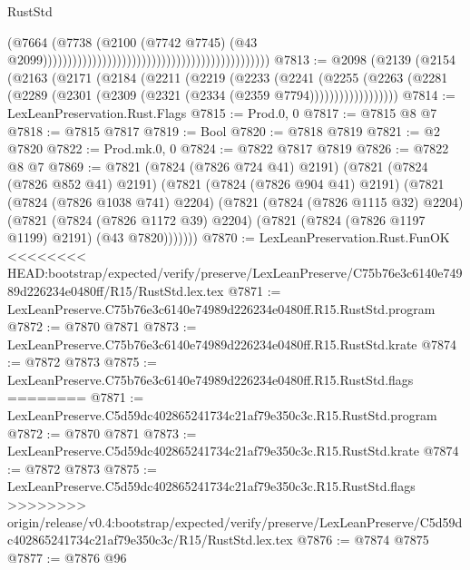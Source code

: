 \begin{lexlean}{RustStd}
\begin{coremodule}
{\begin{coremodule}
{{{{{{{{{{{{{{{{{{{{{{{{{{{{{{{{{{{{{{{{{{{{{{{{{{                                                                                        (@7664
                                                                                          (@7738
                                                                                            (@2100
                                                                                              (@7742
                                                                                                @7745)
                                                                                              (@43
                                                                                                @2099))))))))))))))))))))))))))))))))))))))))))))))
@7813 := @2098
    (@2139
      (@2154
        (@2163
          (@2171
            (@2184
              (@2211
                (@2219
                  (@2233
                    (@2241
                      (@2255
                        (@2263
                          (@2281 (@2289 (@2301 (@2309 (@2321 (@2334 (@2359 @7794))))))))))))))))))
@7814 := LexLeanPreservation.Rust.Flags
@7815 := Prod.{0, 0}
@7817 := @7815 @8 @7
@7818 := @7815 @7817
@7819 := Bool
@7820 := @7818 @7819
@7821 := @2 @7820
@7822 := Prod.mk.{0, 0}
@7824 := @7822 @7817 @7819
@7826 := @7822 @8 @7
@7869 := @7821
    (@7824 (@7826 @724 @41) @2191)
    (@7821
      (@7824 (@7826 @852 @41) @2191)
      (@7821
        (@7824 (@7826 @904 @41) @2191)
        (@7821
          (@7824 (@7826 @1038 @741) @2204)
          (@7821
            (@7824 (@7826 @1115 @32) @2204)
            (@7821
              (@7824 (@7826 @1172 @39) @2204)
              (@7821 (@7824 (@7826 @1197 @1199) @2191) (@43 @7820)))))))
@7870 := LexLeanPreservation.Rust.FunOK
<<<<<<<< HEAD:bootstrap/expected/verify/preserve/LexLeanPreserve/C75b76e3c6140e74989d226234e0480ff/R15/RustStd.lex.tex
@7871 := LexLeanPreserve.C75b76e3c6140e74989d226234e0480ff.R15.RustStd.program
@7872 := @7870 @7871
@7873 := LexLeanPreserve.C75b76e3c6140e74989d226234e0480ff.R15.RustStd.krate
@7874 := @7872 @7873
@7875 := LexLeanPreserve.C75b76e3c6140e74989d226234e0480ff.R15.RustStd.flags
========
@7871 := LexLeanPreserve.C5d59dc402865241734c21af79e350c3c.R15.RustStd.program
@7872 := @7870 @7871
@7873 := LexLeanPreserve.C5d59dc402865241734c21af79e350c3c.R15.RustStd.krate
@7874 := @7872 @7873
@7875 := LexLeanPreserve.C5d59dc402865241734c21af79e350c3c.R15.RustStd.flags
>>>>>>>> origin/release/v0.4:bootstrap/expected/verify/preserve/LexLeanPreserve/C5d59dc402865241734c21af79e350c3c/R15/RustStd.lex.tex
@7876 := @7874 @7875
@7877 := @7876 @96
}}}}}}}}}}}}}}}}}}}}}}}}}}}}}}}}}}}}}}}}}}}}}}}}}}
\end{coremodule}}
\end{coremodule}
\end{lexlean}
